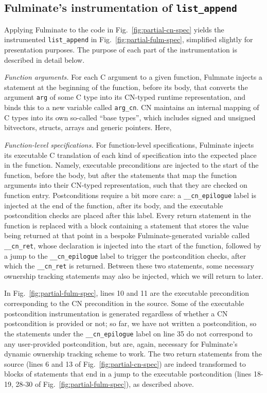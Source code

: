 \subsection{Fulminate's instrumentation of \texttt{list\_append}}

Applying Fulminate to the code in Fig.~\ref{fig:partial-cn-spec} yields the instrumented \texttt{list\_append} in Fig.~\ref{fig:partial-fulm-spec}, simplified slightly for presentation purposes. The purpose of each part of the instrumentation is described in detail below.

\emph{Function arguments.} For each C argument to a given function, Fulmnate injects a statement at the beginning of the function, before its body, that converts the argument \texttt{arg} of some C type into its CN-typed runtime representation, and binds this to a new variable called \texttt{arg\_cn}. CN maintains an internal mapping of C types into its own so-called ``base types'', which includes signed and unsigned bitvectors, structs, arrays and generic pointers. Here, 

\emph{Function-level specifications.} For function-level specifications, Fulminate injects its executable C translation of each kind of specification into the expected place in the function. Namely, executable preconditions are injected to the start of the function, before the body, but after the statements that map the function arguments into their CN-typed representation, such that they are checked on function entry. Postconditions require a bit more care: a \texttt{\_\_cn\_epilogue} label is injected at the end of the function, after its body, and the executable postcondition checks are placed after this label. Every return statement in the function is replaced with a block containing a statement that stores the value being returned at that point in a bespoke Fulminate-generated variable called \texttt{\_\_cn\_ret}, whose declaration is injected into the start of the function, followed by a jump to the \texttt{\_\_cn\_epilogue} label to trigger the postcondition checks, after which the \texttt{\_\_cn\_ret} is returned. Between these two statements, some necessary ownership tracking statements may also be injected, which we will return to later.

In Fig.~\ref{fig:partial-fulm-spec}, lines 10 and 11 are the executable precondition corresponding to the CN precondition in the source. Some of the executable postcondition instrumentation is generated regardless of whether a CN postcondition is provided or not; so far, we have not written a postcondition, so the statements under the \texttt{\_\_cn\_epilogue} label on line 35 do not correspond to any user-provided postcondition, but are, again, necessary for Fulminate's dynamic ownership tracking scheme to work. The two return statements from the source (lines 6 and 13 of Fig.~\ref{fig:partial-cn-spec}) are indeed transformed to blocks of statements that end in a jump to the executable postcondition (lines 18-19, 28-30 of Fig.~\ref{fig:partial-fulm-spec}), as described above.

